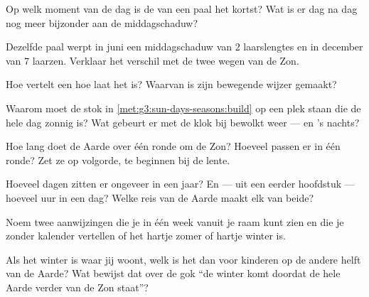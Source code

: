 \begin{exercise}[$\star$]\label{exo:g3:sun-days-seasons:2}
Op welk moment van de dag is de  van een paal het kortst? Wat
is er dag na dag nog meer bijzonder aan de middagschaduw?
\end{exercise}

\begin{exercise}[$\star$]\label{exo:g3:sun-days-seasons:3}
Dezelfde paal werpt in juni een middagschaduw van $2$ laarslengtes
en in december van $7$ laarzen. Verklaar het verschil met de twee
wegen van de Zon.
\end{exercise}

\begin{exercise}[$\star$]\label{exo:g3:sun-days-seasons:4}
Hoe vertelt een  hoe laat het is? Waarvan is zijn bewegende
wijzer gemaakt?
\end{exercise}

\begin{exercise}[$\star$]\label{exo:g3:sun-days-seasons:5}
Waarom moet de stok in \cref{met:g3:sun-days-seasons:build} op een plek
staan die de hele dag zonnig is? Wat gebeurt er met de klok bij
bewolkt weer --- en 's nachts?
\end{exercise}

\begin{exercise}[$\star$]\label{exo:g3:sun-days-seasons:6}
Hoe lang doet de Aarde over één ronde om de Zon? Hoeveel
 passen er in één ronde? Zet ze op volgorde, te beginnen bij
de lente.
\end{exercise}

\begin{exercise}[$\star$]\label{exo:g3:sun-days-seasons:7}
Hoeveel dagen zitten er ongeveer in een jaar? En --- uit een eerder
hoofdstuk --- hoeveel uur in een dag? Welke reis van de Aarde maakt
elk van beide?
\end{exercise}

\begin{exercise}[$\star$]\label{exo:g3:sun-days-seasons:8}
Noem twee aanwijzingen die je in één week vanuit je raam kunt zien en
die je zonder kalender vertellen of het hartje zomer of hartje winter
is.
\end{exercise}

\begin{exercise}[$\star$]\label{exo:g3:sun-days-seasons:9}
Als het winter is waar jij woont, welk  is het dan voor
kinderen op de andere helft van de Aarde? Wat bewijst dat over de gok
``de winter komt doordat de hele Aarde verder van de Zon staat''?
\end{exercise}

